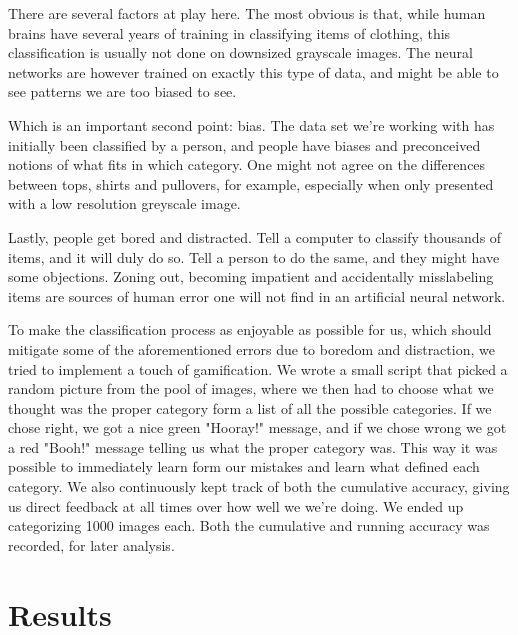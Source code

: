 \documentclass[10pt, twocolumn]{article}
\begin{document}
There are several factors at play here. The most obvious is that, while human brains have several years of training in classifying items of clothing, this classification is usually not done on downsized grayscale images. The neural networks are however trained on exactly this type of data, and might be able to see patterns we are too biased to see. 

Which is an important second point: bias. The data set we're working with has initially been classified by a person, and people have biases and preconceived notions of what fits in which category. One might not agree on the differences between tops, shirts and pullovers, for example, especially when only presented with a low resolution greyscale image.

Lastly, people get bored and distracted. Tell a computer to classify thousands of items, and it will duly do so. Tell a person to do the same, and they might have some objections. Zoning out, becoming impatient and accidentally misslabeling items are sources of human error one will not find in an artificial neural network.

To make the classification process as enjoyable as possible for us, which should mitigate some of the aforementioned errors due to boredom and distraction, we tried to implement a touch of gamification. We wrote a small script that picked a random picture from the pool of images, where we then had to choose what we thought was the proper category form a list of all the possible categories. If we chose right, we got a nice green "Hooray!" message, and if we chose wrong we got a red "Booh!" message telling us what the proper category was. This way it was possible to immediately learn form our mistakes and learn what defined each category. We also continuously kept track of both the cumulative accuracy, giving us direct feedback at all times over how well we we're doing. We ended up categorizing 1000 images each. Both the cumulative and running accuracy was recorded, for later analysis.




\section{Results}
\end{document}
